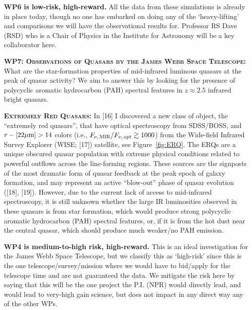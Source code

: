 \noindent
{\bf WP6 is low-risk, high-reward.}
All the data from these simulations is already in place today, though no one 
has embarked on doing any of the `heavy-lifting' and comparisons we will 
have the observational results for. Professor RS Dave (RSD) who is a Chair of Physics 
in the Institute for Astronomy will be a key collaborator here. 


\smallskip
\smallskip
\noindent
\textbf{\textsc{WP7: Observations of Quasars by the James Webb Space Telescope:}} 
What are the star-formation properties of mid-infrared luminous quasars at the peak of quasar activity? 
We aim to answer this by looking for the presence of polycyclic aromatic hydrocarbon (PAH) spectral features 
in $z \approx 2.5$ infrared bright quasars. 

\smallskip
\smallskip
\noindent
\textbf{\textsc{Extremely Red Quasars:}}
In [16] I discovered a new class of object, the ``extremely red
quasars'', that have optical spectroscopy from SDSS/BOSS, and
$r-[22\mu{\rm m}]>14$ colors (i.e., $F_{\nu,\, {\rm MIR}} / F_{\nu,\,
{\rm opt}} \gtrsim 1000$) from the Wide-field Infrared Survey Explorer
(WISE; [17]) satellite, see Figure~\ref{fig:ERQ}.  The ERQs are a
unique obscured quasar population with extreme physical conditions
related to powerful outflows across the line-forming regions. These
sources are the signposts of the most dramatic form of quasar feedback
at the peak epoch of galaxy formation, and may represent an active
``blow-out'' phase of quasar evolution ([18], [19]).  However, due to
the current lack of access to mid-infrared spectroscopy, it is still
unknown whether the large IR luminosities observed in these quasars is
from star formation, which would produce strong polycyclic aromatic
hydrocarbon (PAH) spectral features, or, if it is from the hot dust
near the central quasar, which should produce much weaker/no PAH
emission.

\noindent
{\bf WP4 is medium-to-high risk, high-reward.}
This is an ideal investigation for the James Webb Space Telescope, but we classify this as `high-risk' since this is the one telescope/survey/mission where we would have to bid/apply for the telescope time and are not guaranteed the data. We mitigate the risk here by saying that this will be the one project the P.I. (NPR) would directly lead, and would lead to very-high gain science, but does not impact in any direct way any of the other WPs. 



